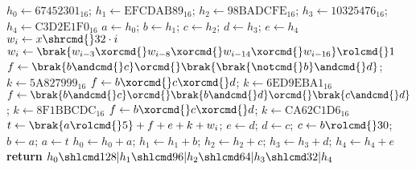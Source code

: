 \begin{algorithmic}[1]
\State $h_0\gets\textrm{67452301}_{16}$; $h_1\gets\textrm{EFCDAB89}_{16}$; $h_2\gets\textrm{98BADCFE}_{16}$; $h_3\gets\textrm{10325476}_{16}$; $h_4\gets\textrm{C3D2E1F0}_{16}$
\State $a\gets h_0$; $b\gets h_1$; $c\gets h_2$; $d\gets h_3$; $e\gets h_4$
\State $w_i\gets x\shrcmd{}32\cdot i$
\EndFor
{}
\State $w_i\gets\brak{w_{i-3}\xorcmd{}w_{i-8}\xorcmd{}w_{i-14}\xorcmd{}w_{i-16}}\rolcmd{}1$
\EndFor
{}
\State $f\gets \brak{b\andcmd{}c}\orcmd{}\brak{\brak{\notcmd{}b}\andcmd{}d}$; $k\gets\textrm{5A827999}_{16}$
\State $f\gets b\xorcmd{}c\xorcmd{}d$; $k\gets\textrm{6ED9EBA1}_{16}$
\State $f\gets \brak{b\andcmd{}c}\orcmd{}\brak{b\andcmd{}d}\orcmd{}\brak{c\andcmd{}d}$; $k\gets\textrm{8F1BBCDC}_{16}$
\State $f\gets b\xorcmd{}c\xorcmd{}d$; $k\gets\textrm{CA62C1D6}_{16}$
\EndIf
\State $t\gets \brak{a\rolcmd{}5}+f+e+k+w_i$; $e\gets d$; $d\gets c$; $c\gets b\rolcmd{}30$; $b\gets a$; $a\gets t$
\EndFor
\State $h_0\gets h_0+a$; $h_1\gets h_1+b$; $h_2\gets h_2+c$; $h_3\gets h_3+d$; $h_4\gets h_4+e$
\EndFor
\State \textbf{return} $h_0\shlcmd128|h_1\shlcmd96|h_2\shlcmd64|h_3\shlcmd32|h_4$
\EndProcedure
\end{algorithmic}